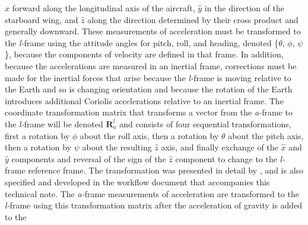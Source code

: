\documentclass[12pt,twoside,english,12pt,twoside,english]{article}\usepackage[]{graphicx}\usepackage[]{color}
\let\OrgIndex\index
\renewcommand*{\index}[1]{\OrgIndex{#1}}
\begin{document}
\begin{enumerate}
$\hat{x}$ forward along the longitudinal axis of the aircraft,
$\hat{y}$ in the direction of the starboard wing, and $\hat{z}$
along the direction determined by their cross product and generally
downward. These measurements of acceleration must be transformed
to the \emph{l-}frame using the attitude angles
for pitch, roll, and heading,
denoted
\{$\theta,\,\phi,\,\psi$\}, because the components of velocity are
defined in that frame. In addition, because the accelerations are
measured in an inertial frame, \label{enu:inertial-corrections}corrections
must be made for the inertial forces
that arise because the \emph{l-}frame is moving relative to the Earth
and so is changing orientation and because the rotation of the Earth
introduces additional Coriolis
accelerations relative to an inertial frame.
The coordinate transformation
matrix that transforms a vector from
the \emph{a-}frame
to the \emph{l-}frame
will be denoted $\mathbf{R}_{a}^{l}$ and consists of four sequential
transformations, first a rotation by $\phi$ about the roll axis,
then a rotation by $\theta$ about the pitch axis, then a rotation
by $\psi$ about the resulting $\hat{z}$ axis, and finally exchange
of the $\hat{x}$ and $\hat{y}$ components and reversal of the sign
of the $\hat{z}$ component to change to the \emph{l-}frame reference
frame. The transformation was presented in detail by \citet{Bulletin23},
and is also specified and developed in the workflow document
that accompanies this technical note. The \emph{a-}frame measurements
of acceleration are transformed
to the \emph{l-}frame
using this transformation matrix
after the acceleration of gravity is added to the

\end{enumerate}
\end{document}
